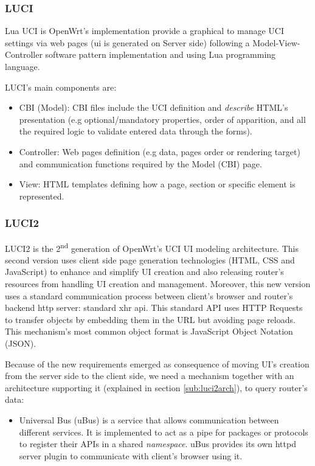 

\subsubsection{LUCI}
Lua UCI is OpenWrt's implementation provide a graphical to manage UCI settings via web pages (\acrshort{ui} is generated on Server side) following a Model-View-Controller software pattern implementation and using Lua programming language.

LUCI's main components are:
\begin{itemize}
    \item CBI (Model): CBI files include the UCI definition and \textit{describe} HTML's presentation (e.g optional/mandatory properties, order of apparition, and all the required logic to validate entered data through the forms).
    \item Controller: Web pages definition (e.g data, pages order or rendering target) and communication functions required by the Model (CBI) page.
    \item View: HTML templates defining how a page, section or specific element is represented.
\end{itemize}

\subsubsection{LUCI2}
\label{sub:sub:luci2}
LUCI2 is the 2\textsuperscript{nd} generation of OpenWrt's UCI UI modeling architecture. This second version uses client side page generation technologies (HTML, CSS and JavaScript) to enhance and simplify UI creation and also releasing router's resources from handling UI creation and management. Moreover, this new version uses a standard communication process between client's browser and router's backend http server: standard \acrfull{xhr} \acrshort{api}. This standard API uses HTTP Requests to transfer objects by embedding them in the URL but avoiding page reloads. This mechanism's most common object format is JavaScript Object Notation (JSON).

Because of the new requirements emerged as consequence of moving UI's creation from the server side to the client side, we need a mechanism together with an architecture supporting it (explained in section \ref{sub:luci2arch}), to query router's data:
\begin{itemize}
    \item Universal Bus (uBus) is a service that allows communication between different services. It is implemented to act as a pipe for packages or protocols to register their APIs in a shared \textit{namespace}. uBus provides its own httpd server plugin to communicate with client's browser using it.
\end{itemize} 

